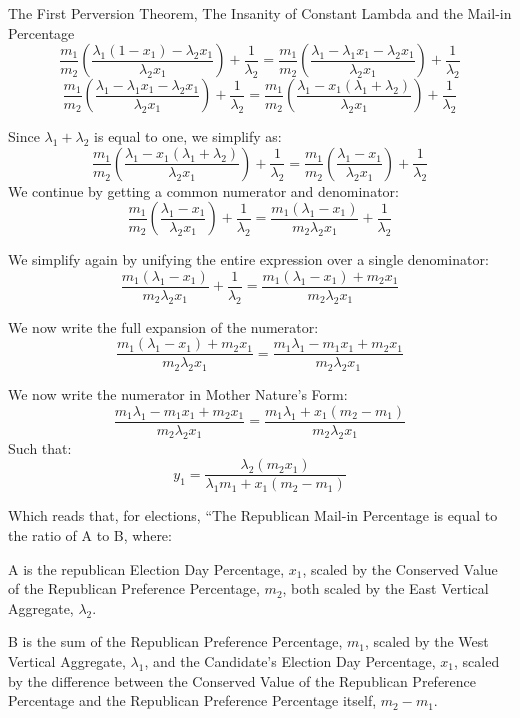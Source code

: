 \begin{theorem}{The First Perversion Theorem, The Insanity of Constant Lambda and the Mail-in Percentage}
$$\frac{m_{1}}{m_{2}}\left(\frac{\lambda_{1}(1-x_{1})-\lambda_{2}x_{1}}{\lambda_{2}x_{1}} \right)+\frac{1}{\lambda_{2}}=\frac{m_{1}}{m_{2}}\left(\frac{\lambda_{1}-\lambda_{1}x_{1}-\lambda_{2}x_{1}}{\lambda_{2}x_{1}} \right)+\frac{1}{\lambda_{2}}$$
$$\frac{m_{1}}{m_{2}}\left(\frac{\lambda_{1}-\lambda_{1}x_{1}-\lambda_{2}x_{1}}{\lambda_{2}x_{1}} \right)+\frac{1}{\lambda_{2}}=\frac{m_{1}}{m_{2}}\left(\frac{\lambda_{1}-x_{1}(\lambda_{1}+\lambda_{2})}{\lambda_{2}x_{1}} \right)+\frac{1}{\lambda_{2}}$$

Since $\lambda_{1}+\lambda_{2}$ is equal to one, we simplify as:
$$\frac{m_{1}}{m_{2}}\left(\frac{\lambda_{1}-x_{1}(\lambda_{1}+\lambda_{2})}{\lambda_{2}x_{1}} \right)+\frac{1}{\lambda_{2}}=\frac{m_{1}}{m_{2}}\left(\frac{\lambda_{1}-x_{1}}{\lambda_{2}x_{1}} \right)+\frac{1}{\lambda_{2}}$$
\newpage
We continue by getting a common numerator and denominator:
$$\frac{m_{1}}{m_{2}}\left(\frac{\lambda_{1}-x_{1}}{\lambda_{2}x_{1}} \right)+\frac{1}{\lambda_{2}}=\frac{m_{1}(\lambda_{1}-x_{1})}{m_{2}\lambda_{2}x_{1}}+\frac{1}{\lambda_{2}}$$

We simplify again by unifying the entire expression over a single denominator:
$$\frac{m_{1}(\lambda_{1}-x_{1})}{m_{2}\lambda_{2}x_{1}}+\frac{1}{\lambda_{2}}=\frac{m_{1}(\lambda_{1}-x_{1})+m_{2}x_{1}}{m_{2}\lambda_{2}x_{1}}$$

We now write the full expansion of the numerator:
$$\frac{m_{1}(\lambda_{1}-x_{1})+m_{2}x_{1}}{m_{2}\lambda_{2}x_{1}}=\frac{m_{1}\lambda_{1}-m_{1}x_{1}+m_{2}x_{1}}{m_{2}\lambda_{2}x_{1}}$$

We now write the numerator in Mother Nature's Form:
$$\frac{m_{1}\lambda_{1}-m_{1}x_{1}+m_{2}x_{1}}{m_{2}\lambda_{2}x_{1}}=\frac{m_{1}\lambda_{1}+x_{1}(m_{2}-m_{1})}{m_{2}\lambda_{2}x_{1}}$$
Such that:
$$y_{1}=\frac{\lambda_{2}(m_{2}x_{1})}{\lambda_{1}m_{1}+x_{1}(m_{2}-m_{1})}$$

Which reads that, for elections, ``The Republican Mail-in Percentage is equal to the ratio of A to B, where:

A is the republican Election Day Percentage, $x_{1}$, scaled by the Conserved Value of the Republican Preference Percentage, $m_{2}$, both scaled by the East Vertical Aggregate, $\lambda_{2}$.

B is the sum of the Republican Preference Percentage, $m_{1}$, scaled by the West Vertical Aggregate, $\lambda_{1}$, and the Candidate's Election Day Percentage, $x_{1}$, scaled by the difference between the Conserved Value of the Republican Preference Percentage and the Republican Preference Percentage itself, $m_{2}-m_{1}$.


\end{theorem}
